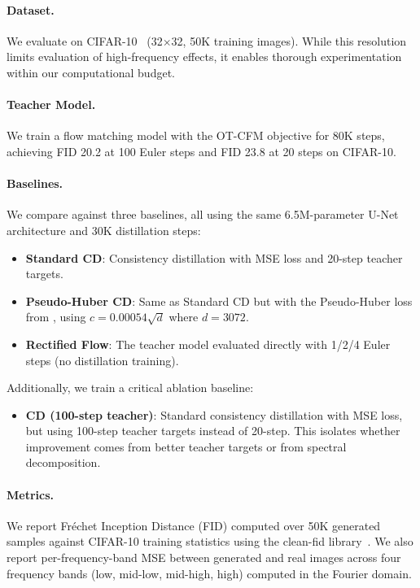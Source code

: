 \documentclass{article}
\begin{document}
\paragraph{Dataset.}
We evaluate on CIFAR-10~\citep{krizhevsky2009learning} (32$\times$32, 50K training images). While this resolution limits evaluation of high-frequency effects, it enables thorough experimentation within our computational budget.

\paragraph{Teacher Model.}
We train a flow matching model with the OT-CFM objective for 80K steps, achieving FID 20.2 at 100 Euler steps and FID 23.8 at 20 steps on CIFAR-10.

\paragraph{Baselines.}
We compare against three baselines, all using the same 6.5M-parameter U-Net architecture and 30K distillation steps:
\begin{itemize}
    \item \textbf{Standard CD}: Consistency distillation with MSE loss and 20-step teacher targets.
    \item \textbf{Pseudo-Huber CD}: Same as Standard CD but with the Pseudo-Huber loss from \citet{song2023improved}, using $c = 0.00054\sqrt{d}$ where $d = 3072$.
    \item \textbf{Rectified Flow}: The teacher model evaluated directly with 1/2/4 Euler steps (no distillation training).
\end{itemize}
Additionally, we train a critical ablation baseline:
\begin{itemize}
    \item \textbf{CD (100-step teacher)}: Standard consistency distillation with MSE loss, but using 100-step teacher targets instead of 20-step. This isolates whether improvement comes from better teacher targets or from spectral decomposition.
\end{itemize}

\paragraph{Metrics.}
We report Fr\'{e}chet Inception Distance (FID) computed over 50K generated samples against CIFAR-10 training statistics using the clean-fid library~\citep{parmar2022cleanfid}. We also report per-frequency-band MSE between generated and real images across four frequency bands (low, mid-low, mid-high, high) computed in the Fourier domain.
\end{document}
